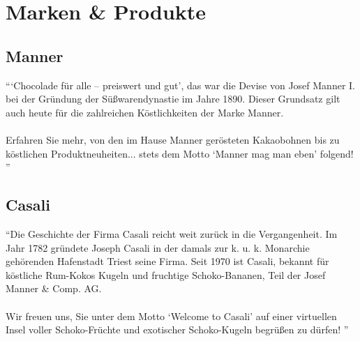 \section{Marken \& Produkte}
\subsection{Manner}
\enquote{\enquote{Chocolade für alle – preiswert und gut}, das war die Devise von Josef Manner I. bei der Gründung der Süßwarendynastie im Jahre 1890. Dieser Grundsatz gilt auch heute für die zahlreichen Köstlichkeiten der Marke Manner.\\\\
Erfahren Sie mehr, von den im Hause Manner gerösteten Kakaobohnen bis zu köstlichen Produktneuheiten... stets dem Motto \enquote{Manner mag man eben} folgend!
}\cite{josef_manner_marken}

\subsection{Casali}
\enquote{Die Geschichte der Firma Casali reicht weit zurück in die Vergangenheit. Im Jahr 1782 gründete Joseph Casali in der damals zur k. u. k. Monarchie gehörenden Hafenstadt Triest seine Firma. Seit 1970 ist Casali, bekannt für köstliche Rum-Kokos Kugeln und fruchtige Schoko-Bananen, Teil der Josef Manner \& Comp. AG.\\\\
Wir freuen uns, Sie unter dem Motto \enquote{Welcome to Casali} auf einer virtuellen Insel voller Schoko-Früchte und exotischer Schoko-Kugeln begrüßen zu dürfen!
}\cite{josef_manner_marken}

